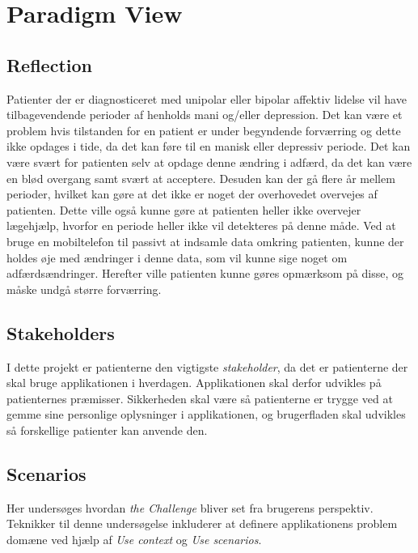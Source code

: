

\section{Paradigm View}

\subsection{Reflection}
Patienter der er diagnosticeret med unipolar eller bipolar affektiv lidelse vil have tilbagevendende perioder af henholds mani og/eller depression.
Det kan være et problem hvis tilstanden for en patient er under begyndende forværring og dette ikke opdages i tide, da det kan føre til en manisk eller depressiv periode.
Det kan være svært for patienten selv at opdage denne ændring i adfærd, da det kan være en blød overgang samt svært at acceptere.
Desuden kan der gå flere år mellem perioder, hvilket kan gøre at det ikke er noget der overhovedet overvejes af patienten.
Dette ville også kunne gøre at patienten heller ikke overvejer lægehjælp, hvorfor en periode heller ikke vil detekteres på denne måde.
Ved at bruge en mobiltelefon til passivt at indsamle data omkring patienten, kunne der holdes øje med ændringer i denne data, som vil kunne sige noget om adfærdsændringer.
Herefter ville patienten kunne gøres opmærksom på disse, og måske undgå større forværring.

\subsection{Stakeholders}
I dette projekt er patienterne den vigtigste \textit{stakeholder}, da det er patienterne der skal bruge applikationen i hverdagen.
Applikationen skal derfor udvikles på patienternes præmisser.
Sikkerheden skal være så patienterne er trygge ved at gemme sine personlige oplysninger i applikationen, og brugerfladen skal udvikles så forskellige patienter kan anvende den.

\subsection{Scenarios}
Her undersøges hvordan \textit{the Challenge} bliver set fra brugerens perspektiv.
Teknikker til denne undersøgelse inkluderer at definere applikationens problem domæne ved hjælp af \textit{Use context} og \textit{Use scenarios}.

